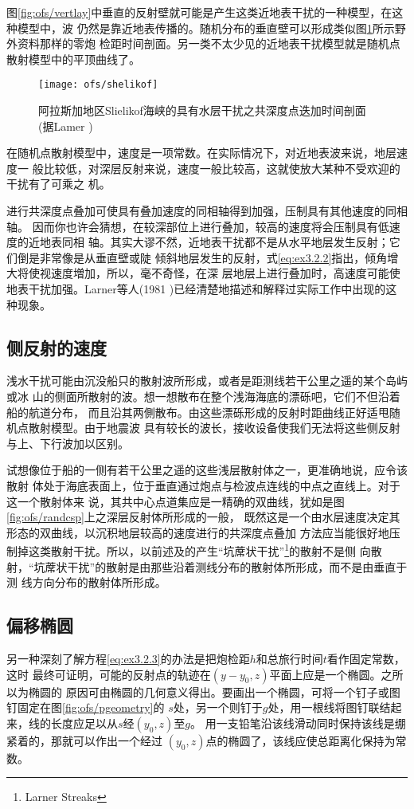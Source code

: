 图\ref{fig:ofs/vertlay}中垂直的反射壁就可能是产生这类近地表干扰的一种模型，在这种模型中，波
仍然是靠近地表传播的。随机分布的垂直壁可以形成类似图\ref{fig:ofs/shelikof}所示野外资料那样的零炮
检距时间剖面。另一类不太少见的近地表干扰模型就是随机点散射模型中的平顶曲线了。

\begin{figure}[H]
\centering
\texttt{[image: ofs/shelikof]}
\caption[shelikof]{阿拉斯加地区Slielikof海峡的具有水层干扰之共深度点迭加时间剖面(据Lamer
) }
\label{fig:ofs/shelikof}
\end{figure}

在随机点散射模型中，速度是一项常数。在实际情况下，对近地表波来说，地层速度一
般比较低，对深层反射来说，速度一般比较高，这就使放大某种不受欢迎的干扰有了可乘之
机。

进行共深度点叠加可使具有叠加速度的同相轴得到加强，压制具有其他速度的同相轴。
因而你也许会猜想，在较深部位上进行叠加，较高的速度将会压制具有低速度的近地表同相
轴。其实大谬不然，近地表干扰都不是从水平地层发生反射；它们倒是非常像是从垂直壁或陡
倾斜地层发生的反射，式\ref{eq:ex3.2.2}指出，倾角增大将使视速度増加，所以，毫不奇怪，在深
层地层上进行叠加时，高速度可能使地表干扰加强。Larner等人(1981
)已经清楚地描述和解释过实际工作中出现的这种现象。

\subsection{侧反射的速度}
\label{sec:3.2.7}

浅水干扰可能由沉没船只的散射波所形成，或者是距测线若干公里之遥的某个岛屿或冰
山的侧面所散射的波。想一想散布在整个浅海海底的漂砾吧，它们不但沿着船的航道分布，
而且沿其两側散布。由这些漂砾形成的反射时距曲线正好适甩随机点散射模型。由于地震波
具有较长的波长，接收设备使我们无法将这些侧反射与上、下行波加以区别。

试想像位于船的一侧有若干公里之遥的这些浅层散射体之一，更准确地说，应令该散射
体处于海底表面上，位于垂直通过炮点与检波点连线的中点之直线上。对于这一个散射体来
说，其共中心点道集应是一精确的双曲线，犹如是图\ref{fig:ofs/randcsp}上之深层反射体所形成的一般，
既然这是一个由水层速度决定其形态的双曲线，以沉积地层较高的速度进行的共深度点叠加
方法应当能很好地压制掉这类散射干扰。所以，以前述及的产生“坑蓆状干扰”\footnote{Larner Streaks}的散射不是侧
向散射，“坑蓆状干扰”的散射是由那些沿着测线分布的散射体所形成，而不是由垂直于测
线方向分布的散射体所形成。

\subsection{偏移椭圆}
\label{sec:3.2.8}

另一种深刻了解方程\ref{eq:ex3.2.3}的办法是把炮检距$h$和总旅行时间$t$看作固定常数，这时
最终可证明，可能的反射点的轨迹在$(y-y_0,z)$平面上应是一个椭圆。之所以为椭圆的
原因可由椭圆的几何意义得出。要画出一个椭圆，可将一个钉子或图钉固定在图\ref{fig:ofs/pgeometry}的
$s$处，另一个则钉于$g$处，用一根线将图钉联结起来，线的长度应足以从$s$经$(y_0,z)$至$g$。
用一支铅笔沿该线滑动同时保持该线是绷紧着的，那就可以作出一个经过
$(y_0,z)$点的椭圆了，该线应使总距离化保持为常数。

